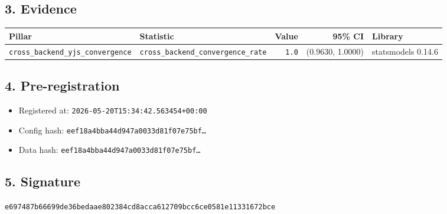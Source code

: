 \documentclass{article}
\begin{document}
\subsection*{3. Evidence}
\begin{tabular}{llrrl}\toprule
\textbf{Pillar} & \textbf{Statistic} & \textbf{Value} & \textbf{95\% CI} & \textbf{Library} \\\midrule
\texttt{cross\_backend\_yjs\_convergence} & \texttt{cross\_backend\_convergence\_rate} & \texttt{1.0} & (0.9630, 1.0000) & statsmodels 0.14.6 \\
\bottomrule\end{tabular}
\subsection*{4. Pre-registration}
\begin{itemize}
\item Registered at: \texttt{2026-05-20T15:34:42.563454+00:00}
\item Config hash: \texttt{eef18a4bba44d947a0033d81f07e75bf\dots}
\item Data hash: \texttt{eef18a4bba44d947a0033d81f07e75bf\dots}
\end{itemize}
\subsection*{5. Signature}
\texttt{e697487b66699de36bedaae802384cd8acca612709bcc6ce0581e11331672bce}\\
\end{document}
